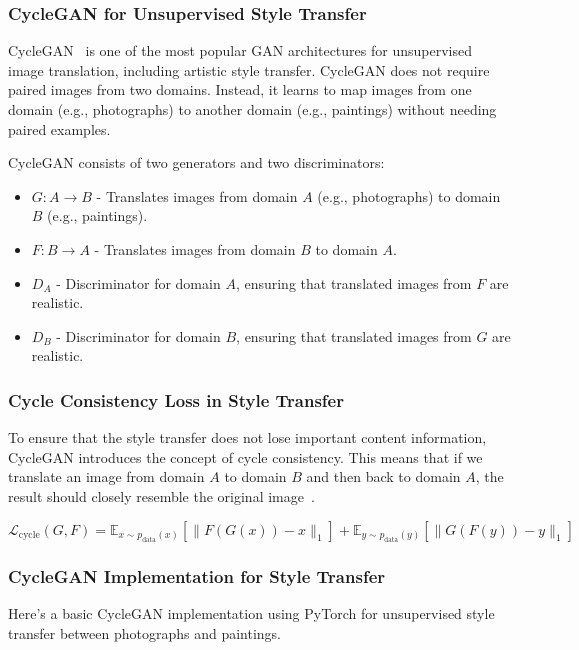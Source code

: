 \subsubsection{CycleGAN for Unsupervised Style Transfer}
CycleGAN~\cite{chu2017cyclegan} is one of the most popular GAN architectures for unsupervised image translation, including artistic style transfer. CycleGAN does not require paired images from two domains. Instead, it learns to map images from one domain (e.g., photographs) to another domain (e.g., paintings) without needing paired examples.

CycleGAN consists of two generators and two discriminators:
\begin{itemize}
    \item \( G: A \to B \) - Translates images from domain \( A \) (e.g., photographs) to domain \( B \) (e.g., paintings).
    \item \( F: B \to A \) - Translates images from domain \( B \) to domain \( A \).
    \item \( D_A \) - Discriminator for domain \( A \), ensuring that translated images from \( F \) are realistic.
    \item \( D_B \) - Discriminator for domain \( B \), ensuring that translated images from \( G \) are realistic.
\end{itemize}

\subsubsection{Cycle Consistency Loss in Style Transfer}
To ensure that the style transfer does not lose important content information, CycleGAN introduces the concept of cycle consistency. This means that if we translate an image from domain \( A \) to domain \( B \) and then back to domain \( A \), the result should closely resemble the original image~\cite{chu2017cyclegan}.

\[
\mathcal{L}_{\text{cycle}}(G, F) = \mathbb{E}_{x \sim p_{\text{data}}(x)}[\| F(G(x)) - x \|_1] + \mathbb{E}_{y \sim p_{\text{data}}(y)}[\| G(F(y)) - y \|_1]
\]

\subsubsection{CycleGAN Implementation for Style Transfer}
Here's a basic CycleGAN implementation using PyTorch for unsupervised style transfer between photographs and paintings.

